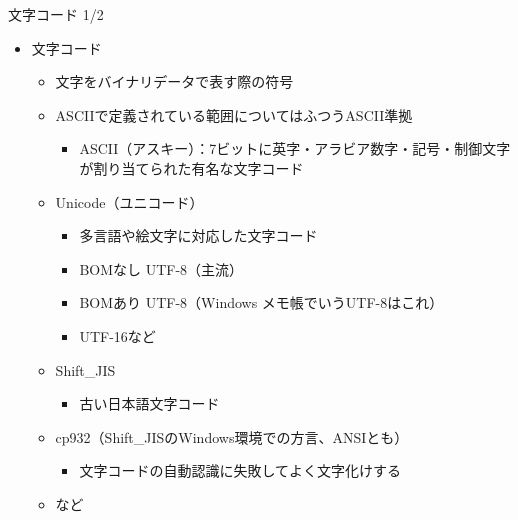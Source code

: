 \documentclass[12pt,aspectratio=169]{beamer}
\begin{document}
\begin{frame}{文字コード 1/2}
  \begin{itemize}
    \item 文字コード
      \begin{itemize}
        \item 文字をバイナリデータで表す際の符号
        \item ASCIIで定義されている範囲についてはふつうASCII準拠
          \begin{itemize}
            \item ASCII（アスキー）：7ビットに英字・アラビア数字・記号・制御文字が割り当てられた有名な文字コード
          \end{itemize}
        \item Unicode（ユニコード）
          \begin{itemize}
            \item 多言語や絵文字に対応した文字コード
            \item BOMなし UTF-8（主流）
            \item BOMあり UTF-8（Windows メモ帳でいうUTF-8はこれ）
            \item UTF-16など
          \end{itemize}
        \item Shift\_JIS
          \begin{itemize}
            \item 古い日本語文字コード
          \end{itemize}
        \item cp932（Shift\_JISのWindows環境での方言、ANSIとも）
          \begin{itemize}
            \item 文字コードの自動認識に失敗してよく文字化けする
          \end{itemize}
        \item など
      \end{itemize}

  \end{itemize}

\end{frame}
\end{document}

